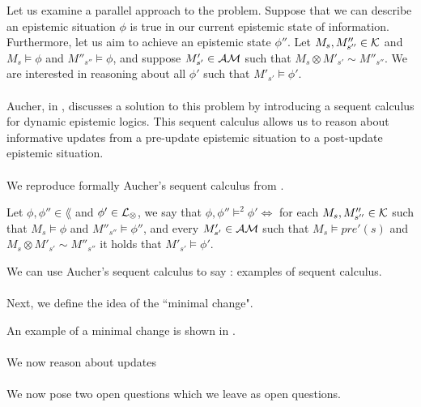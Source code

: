 Let us examine a parallel approach to the problem.
Suppose that we can describe an epistemic situation $\phi$ is true in our current epistemic state of
information.
Furthermore, let us aim to achieve an epistemic state $\phi''$.
Let $M_s, M''_{s''} \in \mathcal{K}$ and $M_s \models \phi$ and $M''_{s''}
\models \phi$, and suppose $M'_{s'} \in \mathcal{AM}$ such that $M_s \otimes
M'_{s'} \sim M''_{s''}$.
We are interested in reasoning about all $\phi'$ such that $M'_{s'}
\models \phi'$.\\
\\
Aucher, in \cite{doi:10.3166/jancl.21.289-321,doi:10.1080/11663081.2012.736703},
discusses a solution to this problem by introducing a sequent calculus for dynamic 
epistemic logics.
This sequent calculus allows us to reason about informative updates from
a pre-update epistemic situation to a post-update epistemic situation.\\
\\
We reproduce formally Aucher's sequent calculus from
\cite{doi:10.1080/11663081.2012.736703}.

\begin{defn}
Let $\phi, \phi'' \in \lang$ and $\phi' \in \mathcal{L}_{\otimes}$, we say that
$\phi, \phi'' \models^2 \phi' \iff$ for each $M_s, M''_{s''} \in \mathcal{K}$
such that $M_s \models \phi$ and $M''_{s''} \models \phi''$, and every $M'_{s'}
\in \mathcal{AM}$ such that $M_s \models pre'(s)$ and $M_s \otimes M'_{s'}
\sim M''_{s''}$ it holds that $M'_{s'} \models \phi'$.
\end{defn}

We can use Aucher's sequent calculus to say \FIXME: examples of sequent calculus.\\
\\
Next, we define the idea of the ``minimal change".

\begin{defn}
	\FIXME
\end{defn}

An example of a minimal change is shown in \FIXME.\\
\\
We now reason about updates \FIXME \\
\\
We now pose two open questions which we leave as open questions.
\FIXME
